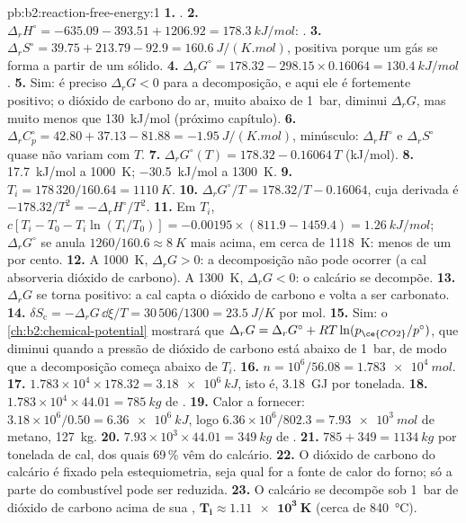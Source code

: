 \begin{solution}{pb:b2:reaction-free-energy:1}
\textbf{1.} .
\textbf{2.} $\Delta_r H^\circ = -635.09 - 393.51 + 1206.92 =
\qty{+178.3}{kJ/mol}$: .
\textbf{3.} $\Delta_r S^\circ = 39.75 + 213.79 - 92.9 = \qty{+160.6}{J/(K.mol)}$,
positiva porque um gás se forma a partir de um sólido.
\textbf{4.} $\Delta_r G^\circ = 178.32 - 298.15 \times 0.16064 =
\qty{+130.4}{kJ/mol}$.
\textbf{5.} Sim: é preciso $\Delta_r G < 0$ para a decomposição, e aqui ele
é fortemente positivo; o dióxido de carbono do ar, muito abaixo de \qty{1}{bar},
diminui $\Delta_r G$, mas muito menos que \qty{130}{kJ/mol} (próximo capítulo).
\textbf{6.} $\Delta_r C^\circ_p = 42.80 + 37.13 - 81.88 =
\qty{-1.95}{J/(K.mol)}$, minúsculo: $\Delta_r H^\circ$ e $\Delta_r S^\circ$
quase não variam com $T$.
\textbf{7.} $\Delta_r G^\circ(T) = 178.32 - 0.16064\,T$ (\unit{kJ/mol}).
\textbf{8.} \qty{+17.7}{kJ/mol} a \qty{1000}{K}; \qty{-30.5}{kJ/mol} a
\qty{1300}{K}.
\textbf{9.} $T_i = 178\,320/160.64 = \qty{1110}{K}$.
\textbf{10.} $\Delta_r G^\circ/T = 178.32/T - 0.16064$, cuja derivada é
$-178.32/T^2 = -\Delta_r H^\circ/T^2$.
\textbf{11.} Em $T_i$, $c[T_i - T_0 - T_i\ln(T_i/T_0)] = -0.00195 \times
(811.9 - 1459.4) = \qty{+1.26}{kJ/mol}$; $\Delta_r G^\circ$ se anula
$1260/160.6 \approx \qty{8}{K}$ mais acima, em cerca de \qty{1118}{K}: menos
de um por cento.
\textbf{12.} A \qty{1000}{K}, $\Delta_r G > 0$: a decomposição não pode
ocorrer (a cal absorveria dióxido de carbono). A \qty{1300}{K}, $\Delta_r G <
0$: o calcário se decompõe.
\textbf{13.} $\Delta_r G$ se torna positivo: a cal capta o dióxido de carbono
e volta a ser carbonato.
\textbf{14.} $\delta S_{\text{c}} = -\Delta_r G\,\dd\xi/T = 30\,506/1300 =
\qty{23.5}{J/K}$ por mol.
\textbf{15.} Sim: o \cref{ch:b2:chemical-potential} mostrará que
$\Delta_r G = \Delta_r G^\circ + RT\ln(p_{\ce{CO2}}/p^\circ)$, que diminui
quando a pressão de dióxido de carbono está abaixo de \qty{1}{bar}, de modo
que a decomposição começa abaixo de $T_i$.
\textbf{16.} $n = 10^6/56.08 = \qty{1.783e4}{mol}$.
\textbf{17.} $1.783 \times 10^4 \times 178.32 = \qty{3.18e6}{kJ}$, isto é,
\qty{3.18}{GJ} por tonelada.
\textbf{18.} $1.783 \times 10^4 \times 44.01 = \qty{785}{kg}$ de .
\textbf{19.} Calor a fornecer: $3.18 \times 10^6/0.50 = \qty{6.36e6}{kJ}$, logo
$6.36 \times 10^6/802.3 = \qty{7.93e3}{mol}$ de metano, \qty{127}{kg}.
\textbf{20.} $7.93 \times 10^3 \times 44.01 = \qty{349}{kg}$ de .
\textbf{21.} $785 + 349 = \qty{1134}{kg}$ por tonelada de cal, dos quais 69\,\%
vêm do calcário.
\textbf{22.} O dióxido de carbono do calcário é fixado pela estequiometria,
seja qual for a fonte de calor do forno; só a parte do combustível pode ser
reduzida.
\textbf{23.} O calcário se decompõe sob \qty{1}{bar} de dióxido de carbono
acima de sua , $\boldsymbol{T_i \approx \qty{1.11e3}{K}}$
(cerca de \qty{840}{\celsius}).
\end{solution}
